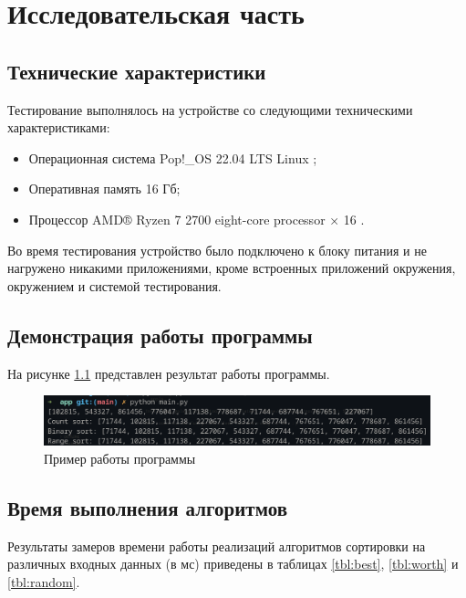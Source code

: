 \chapter{Исследовательская часть}
\section{Технические характеристики}
Тестирование выполнялось на устройстве со следующими техническими характеристиками:
\begin{itemize}
	\item Операционная система Pop!\_OS 22.04 LTS \cite{ubuntu} Linux \cite{linux};
	\item Оперативная память 16 Гб;
	\item Процессор AMD® Ryzen 7 2700 eight-core processor × 16 \cite{amd}.
\end{itemize}
Во время тестирования устройство было подключено к блоку питания и не нагружено никакими приложениями, кроме встроенных приложений окружения, окружением и системой тестирования.

\section{Демонстрация работы программы}



На рисунке \ref{demonstration} представлен результат работы программы.

\begin{figure}[ht!]
	\begin{center}
		\captionsetup{singlelinecheck = false, justification=centerfirst}
		\includegraphics[scale=0.8]{assets/demonstation.png}
		\caption{Пример работы программы}
		\label{demonstration}
	\end{center}
	
	
\end{figure}

\newpage

\section{Время выполнения алгоритмов}

Результаты замеров времени работы реализаций алгоритмов сортировки на различных входных данных (в мс) приведены в таблицах \ref{tbl:best}, \ref{tbl:worth} и \ref{tbl:random}.

